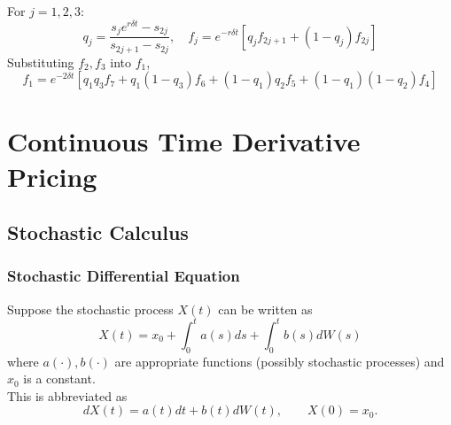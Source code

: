 \documentclass[11pt]{article}
\begin{document}
\begin{center}
{
		}
		\end{center}
	For \( j = 1,2,3 \):
	\[	q_j = \frac{s_{j}e^{r\delta t} - s_{2j}}{s_{2j+1} - s_{2j}}, \quad
		f_{j} = e^{-r\delta t}\left[q_{j} f_{2j+1} + (1-q_{j})f_{2j}\right]
			\]
	Substituting \( f_2, f_3 \) into \( f_1 \),
	\[	f_1 = e^{-2\delta t}\left[q_1q_3 f_7 + q_1 (1- q_3) f_6 + 
								  (1-q_1) q_2 f_5 + (1 - q_1)(1-q_2) f_4\right]
		\]

	\section{Continuous Time Derivative Pricing}
	
	\subsection{Stochastic Calculus} 
	\subsubsection{Stochastic Differential Equation}
	Suppose the stochastic process \( X(t) \) can be written as
	\[	X(t) = x_0 + \int_{0}^{t} a(s) ds + \int_{0}^{t} b(s) dW(s)\]
	where \( a(\cdot), b(\cdot) \) are appropriate functions (possibly stochastic processes) and \( x_0 \) is a constant.\\
	This is abbreviated as
	\[	dX(t) = a(t) dt + b(t) dW(t), \qquad X(0) = x_0.\]
\end{document}
